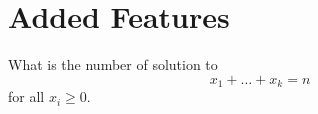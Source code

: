 \chapter{Added Features}
\begin{question}
    What is the number of solution to 
    \[
        x_1 + \dots + x_k = n
    \] for all \(x_i \ge 0\). 
\end{question}